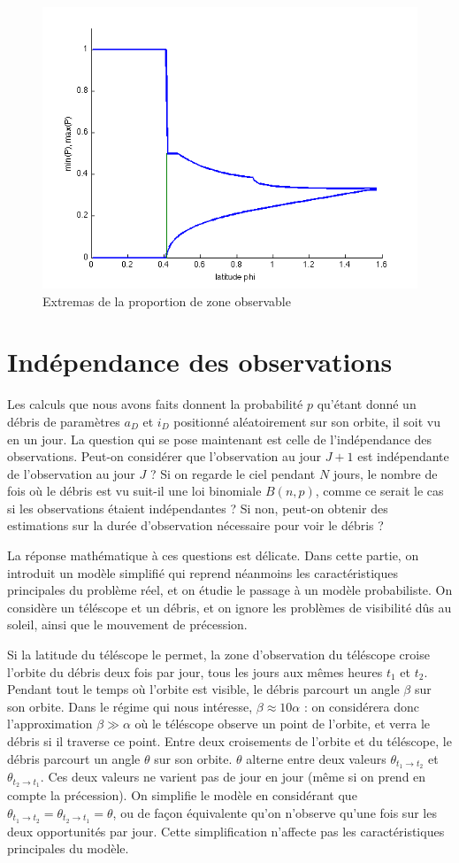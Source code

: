\documentclass[a4paper,11pt]{article}
\numberwithin{section}{part}
\begin{document}
  \begin{figure}[ht]
    \centering
    \includegraphics[width=.7\textwidth]{ecart.png}
    \caption{Extremas de la proportion de zone observable}\label{ecart}
 \end{figure}


\section{Indépendance des observations}
Les calculs que nous avons faits donnent la probabilité $p$ qu'étant
donné un débris de paramètres $a_{D}$ et $i_{D}$ positionné
aléatoirement sur son orbite, il soit vu en un jour. La question qui
se pose maintenant est celle de l'indépendance des
observations. Peut-on considérer que l'observation au jour $J+1$ est
indépendante de l'observation au jour $J$ ? Si on regarde le ciel
pendant $N$ jours, le nombre de fois où le débris est vu suit-il une
loi binomiale $B(n,p)$, comme ce serait le cas si les observations
étaient indépendantes ? Si non, peut-on obtenir des estimations sur la
durée d'observation nécessaire pour voir le débris ?

La réponse mathématique à ces questions est délicate. Dans cette
partie, on introduit un modèle simplifié qui reprend néanmoins les
caractéristiques principales du problème réel, et on étudie le passage
à un modèle probabiliste. On considère un téléscope et un débris, et
on ignore les problèmes de visibilité dûs au soleil, ainsi que le
mouvement de précession.

Si la latitude du téléscope le permet, la zone d'observation du
téléscope croise l'orbite du débris deux fois par jour, tous les jours
aux mêmes heures $t_{1}$ et $t_{2}$. Pendant tout le temps où l'orbite
est visible, le débris parcourt un angle $\beta$ sur son orbite. Dans
le régime qui nous intéresse, $\beta \approx 10 \alpha$ : on
considérera donc l'approximation $\beta \gg \alpha$ où le téléscope
observe un point de l'orbite, et verra le débris si il traverse ce
point. Entre deux croisements de l'orbite et du téléscope, le débris
parcourt un angle $\theta$ sur son orbite. $\theta$ alterne entre deux
valeurs $\theta_{t_{1} \to t_{2}}$ et $\theta_{t_{2} \to t_{1}}$. Ces
deux valeurs ne varient pas de jour en jour (même si on prend en
compte la précession). On simplifie le modèle en considérant que
$\theta_{t_{1} \to t_{2}} = \theta_{t_{2} \to t_{1}} = \theta$, ou de
façon équivalente qu'on n'observe qu'une fois sur les deux
opportunités par jour. Cette simplification n'affecte pas les
caractéristiques principales du modèle.
\end{document}
